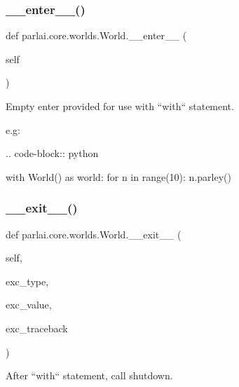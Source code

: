 \subsubsection{\texorpdfstring{\+\_\+\+\_\+enter\+\_\+\+\_\+()}{\_\_enter\_\_()}}
{\footnotesize\ttfamily def parlai.\+core.\+worlds.\+World.\+\_\+\+\_\+enter\+\_\+\+\_\+ (\begin{DoxyParamCaption}\item[{}]{self }\end{DoxyParamCaption})}

\begin{DoxyVerb}Empty enter provided for use with ``with`` statement.

e.g:

.. code-block:: python

    with World() as world:
for n in range(10):
    n.parley()
\end{DoxyVerb}
 \mbox{\label{classparlai_1_1core_1_1worlds_1_1World_ae2b8ea006564cbefbe8520f45fb71040}} 
\subsubsection{\texorpdfstring{\+\_\+\+\_\+exit\+\_\+\+\_\+()}{\_\_exit\_\_()}}
{\footnotesize\ttfamily def parlai.\+core.\+worlds.\+World.\+\_\+\+\_\+exit\+\_\+\+\_\+ (\begin{DoxyParamCaption}\item[{}]{self,  }\item[{}]{exc\+\_\+type,  }\item[{}]{exc\+\_\+value,  }\item[{}]{exc\+\_\+traceback }\end{DoxyParamCaption})}

\begin{DoxyVerb}After ``with`` statement, call shutdown.
\end{DoxyVerb}
 \mbox{\label{classparlai_1_1core_1_1worlds_1_1World_a147371097765449933ca963215eba603}} 
